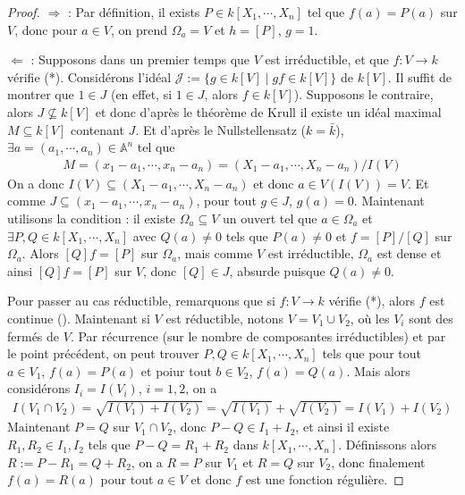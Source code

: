         \begin{proof}
            \item $\Rightarrow$ : Par définition, il exists $P \in k[X_1, \cdots, X_n]$ tel que $f(a) = P(a)$ sur $V$, donc pour $a \in V$, on prend $\Omega_a = V$ et $h = [P]$, $g = 1$.
            \item $\Leftarrow$ : Supposons dans un premier temps que $V$ est irréductible, et que $f : V \to k$ vérifie (*). Considérons l'idéal $\mathcal{J} := \{g \in k[V] \mid gf \in k[V]\}$ de $k[V]$. Il suffit de montrer que $1 \in J$ (en effet, si $1 \in J$, alors $f \in k[V]$). Supposons le contraire, alors $J \nsubseteq k[V]$ et donc d'après le théorème de Krull il existe un idéal maximal $M \subseteq k[V]$ contenant $J$. Et d'après le Nullstellensatz ($k = \bar k$), $\exists a = (a_1, \cdots, a_n) \in \mathbb{A}^n$ tel que
            \begin{align*}
                M = (x_1 - a_1, \cdots, x_n - a_n) = (X_1 - a_1, \cdots, X_n - a_n)/I(V)
            \end{align*}
            On a donc $I(V) \subseteq (X_1 - a_1, \cdots, X_n - a_n)$ et donc $a \in V(I(V)) = V$. Et comme $J \subseteq (x_1 - a_1, \cdots, x_n - a_n)$, pour tout $g \in J$, $g(a) = 0$. Maintenant utilisons la condition : il existe $\Omega_a \subseteq V$ un ouvert tel que $a \in \Omega_a$ et $\exists P,Q \in k[X_1, \cdots, X_n]$ avec $Q(a) \neq 0$ tels que $P(a) \neq 0$ et $f = [P]/[Q]$ sur $\Omega_a$. Alors $[Q]f = [P]$ sur $\Omega_a$, mais comme $V$ est irréductible, $\Omega_a$ est dense et ainsi $[Q]f = [P]$ sur $V$, donc $[Q] \in J$, absurde puisque $Q(a) \neq 0$.
            \item Pour passer au cas réductible, remarquons que si $f : V \to k$ vérifie (*), alors $f$ est continue (). Maintenant si $V$ est réductible, notons $V = V_1 \cup V_2$, où les $V_i$ sont des fermés de $V$. Par récurrence (sur le nombre de composantes irréductibles) et par le point précédent, on peut trouver $P,Q \in k[X_1, \cdots, X_n]$ tels que pour tout $a \in V_1$, $f(a) = P(a)$ et poiur tout $b \in V_2$, $f(a) = Q(a)$. Mais alors considérons $I_i = I(V_i)$, $i = 1,2$, on a
            \begin{align*}
                I(V_1 \cap V_2) = \sqrt{I(V_1) + I(V_2)} = \sqrt{I(V_1)} + \sqrt{I(V_2)} = I(V_1) + I(V_2)
            \end{align*}
            Maintenant $P = Q$ sur $V_1 \cap V_2$, donc $P - Q \in I_1 + I_2$, et ainsi il existe $R_1, R_2 \in I_1, I_2$ tels que $P - Q = R_1 + R_2$ dans $k[X_1, \cdots, X_n]$. Définissons alors $R := P - R_1 = Q + R_2$, on a $R = P$ sur $V_1$ et $R = Q$ sur $V_2$, donc finalement $f(a) = R(a)$ pour tout $a \in V$ et donc $f$ est une fonction régulière.
        \end{proof}
